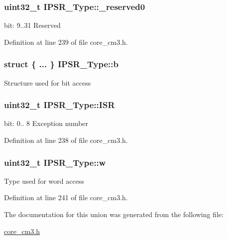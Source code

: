 \subsubsection[{\texorpdfstring{\+\_\+reserved0}{_reserved0}}]{\setlength{\rightskip}{0pt plus 5cm}uint32\+\_\+t I\+P\+S\+R\+\_\+\+Type\+::\+\_\+reserved0}\hypertarget{unionIPSR__Type_ad2eb0a06de4f03f58874a727716aa9aa}{}\label{unionIPSR__Type_ad2eb0a06de4f03f58874a727716aa9aa}
bit\+: 9..31 Reserved 

Definition at line 239 of file core\+\_\+cm3.\+h.

\subsubsection[{\texorpdfstring{b}{b}}]{\setlength{\rightskip}{0pt plus 5cm}struct \{ ... \}   I\+P\+S\+R\+\_\+\+Type\+::b}\hypertarget{unionIPSR__Type_add0d6497bd50c25569ea22b48a03ec50}{}\label{unionIPSR__Type_add0d6497bd50c25569ea22b48a03ec50}
Structure used for bit access 
\subsubsection[{\texorpdfstring{I\+SR}{ISR}}]{\setlength{\rightskip}{0pt plus 5cm}uint32\+\_\+t I\+P\+S\+R\+\_\+\+Type\+::\+I\+SR}\hypertarget{unionIPSR__Type_ab46e5f1b2f4d17cfb9aca4fffcbb2fa5}{}\label{unionIPSR__Type_ab46e5f1b2f4d17cfb9aca4fffcbb2fa5}
bit\+: 0.. 8 Exception number 

Definition at line 238 of file core\+\_\+cm3.\+h.

\subsubsection[{\texorpdfstring{w}{w}}]{\setlength{\rightskip}{0pt plus 5cm}uint32\+\_\+t I\+P\+S\+R\+\_\+\+Type\+::w}\hypertarget{unionIPSR__Type_a4adca999d3a0bc1ae682d73ea7cfa879}{}\label{unionIPSR__Type_a4adca999d3a0bc1ae682d73ea7cfa879}
Type used for word access 

Definition at line 241 of file core\+\_\+cm3.\+h.



The documentation for this union was generated from the following file\+:\begin{DoxyCompactItemize}
\item 
\hyperlink{core__cm3_8h}{core\+\_\+cm3.\+h}\end{DoxyCompactItemize}
